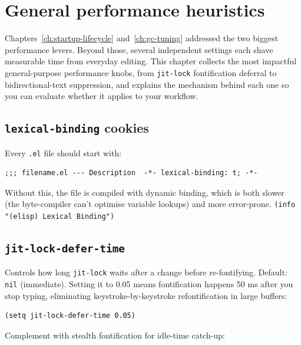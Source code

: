 \chapter{General performance heuristics}
\label{ch:general-performance}
\minitoc\label{general-performance-heuristics}

Chapters~\ref{ch:startup-lifecycle} and~\ref{ch:gc-tuning} addressed
the two biggest performance levers.  Beyond those, several
independent settings each shave measurable time from everyday editing.  This chapter
collects the most impactful general-purpose performance knobs, from
\texttt{jit-lock} fontification deferral to bidirectional-text
suppression, and explains the mechanism behind each one so you can
evaluate whether it applies to your workflow.

\section{\texttt{lexical-binding} cookies}\label{lexical-binding-cookies}

Every \texttt{.el} file should start with:

\begin{verbatim}
;;; filename.el --- Description  -*- lexical-binding: t; -*-
\end{verbatim}

Without this, the file is compiled with dynamic binding, which is both slower (the byte-compiler can't optimise variable lookups) and more error-prone. \texttt{(info "(elisp) Lexical Binding")}

\section{\texttt{jit-lock-defer-time}}\label{jit-lock-defer-time}

Controls how long \texttt{jit-lock} waits after a change before re-fontifying. Default: \texttt{nil} (immediate). Setting it to 0.05 means fontification happens 50 ms after you stop typing, eliminating keystroke-by-keystroke refontification in large buffers:

\begin{verbatim}
(setq jit-lock-defer-time 0.05)
\end{verbatim}

Complement with stealth fontification for idle-time catch-up:

